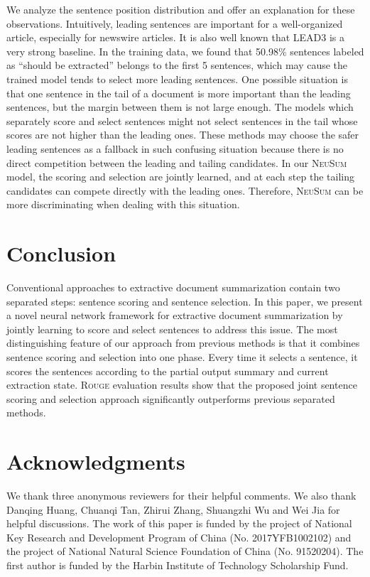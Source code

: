 \documentclass[11pt,a4paper]{article}
\newcommand{\ourModelName}{\textsc{NeuSum}}
\begin{document}
We analyze the sentence position distribution and offer an explanation for these observations.
Intuitively, leading sentences are important for a well-organized article, especially for newswire articles.
It is also well known that \textsc{LEAD3} is a very strong baseline.
In the training data, we found that 50.98\% sentences labeled as ``should be extracted'' belongs to the first 5 sentences, which may cause the trained model tends to select more leading sentences.
One possible situation is that one sentence in the tail of a document is more important than the leading sentences, but the margin between them is not large enough.
The models which separately score and select sentences might not select sentences in the tail whose scores are not higher than the leading ones.
These methods may choose the safer leading sentences as a fallback in such confusing situation because there is no direct competition between the leading and tailing candidates.
In our \ourModelName{} model, the scoring and selection are jointly learned, and at each step the tailing candidates can compete directly with the leading ones.
Therefore, \ourModelName{} can be more discriminating when dealing with this situation.




 \section{Conclusion}
Conventional approaches to extractive document summarization contain two separated steps: sentence scoring and sentence selection.
In this paper, we present a novel neural network framework for extractive document summarization by jointly learning to score and select sentences to address this issue.
The most distinguishing feature of our approach from previous methods is that it combines sentence scoring and selection into one phase.
Every time it selects a sentence, it scores the sentences according to the partial output summary and current extraction state.
\textsc{Rouge} evaluation results show that the proposed joint sentence scoring and selection approach significantly outperforms previous separated methods.

 
\section*{Acknowledgments}

We thank three anonymous reviewers for their helpful comments.
We also thank  Danqing Huang,  Chuanqi Tan, Zhirui Zhang, Shuangzhi Wu and Wei Jia  for helpful discussions.
The work of this paper is funded by the project of National Key Research and Development Program of China (No. 2017YFB1002102) and the project of National Natural Science Foundation of China (No. 91520204). 
The first author is funded by the Harbin Institute of Technology Scholarship Fund. 



\end{document}
